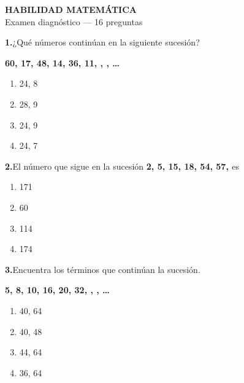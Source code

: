 \documentclass[12pt]{article}
\begin{document}
\begin{center}
{\Large\bfseries HABILIDAD MATEM\'ATICA}\\[3pt]
{\normalsize Examen diagn\'ostico --- 16 preguntas}
\end{center}

\bigskip


\noindent\textbf{1.}\quad ¿Qué números continúan en la siguiente sucesión?

\medskip
\centerline{\textbf{60, 17, 48, 14, 36, 11, \underline{\quad}, \underline{\quad}, \ldots}}
\medskip

\begin{enumerate}[label=\Alph*), nosep, leftmargin=2cm]
\item 24, 8
\item 28, 9
\item 24, 9
\item 24, 7
\end{enumerate}


\bigskip

\noindent\textbf{2.}\quad El número que sigue en la sucesión 
\textbf{2, 5, 15, 18, 54, 57, \underline{\quad}} es

\medskip
\begin{enumerate}[label=\Alph*), nosep, leftmargin=2cm]
\item 171
\item 60
\item 114
\item 174
\end{enumerate}


\bigskip

\noindent\textbf{3.}\quad Encuentra los términos que continúan la sucesión.

\medskip
\centerline{\textbf{5, 8, 10, 16, 20, 32, \underline{\quad}, \underline{\quad}, \ldots}}
\medskip

\begin{enumerate}[label=\Alph*), nosep, leftmargin=2cm]
\item 40, 64
\item 40, 48
\item 44, 64
\item 36, 64
\end{enumerate}
\end{document}
